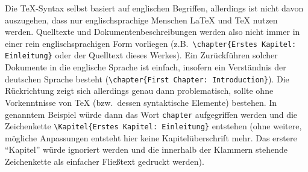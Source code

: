 Die \TeX{}-Syntax selbst basiert auf englischen Begriffen, allerdings ist nicht davon auszugehen, dass nur englischsprachige Menschen \LaTeX{} und \TeX{} nutzen werden. Quelltexte und Dokumentenbeschreibungen werden also nicht immer in einer rein englischsprachigen Form vorliegen (z.B.\ \verb|\chapter{Erstes Kapitel: Einleitung}| oder der Quelltext dieses Werkes). 
Ein Zurückführen solcher Dokumente in die englische Sprache ist einfach, insofern ein Verständnis der deutschen Sprache besteht (\verb|\chapter{First Chapter: Introduction}|). 
Die Rückrichtung zeigt sich allerdings genau dann problematisch, sollte ohne Vorkenntnisse von \TeX{} (bzw.\ dessen syntaktische Elemente) bestehen. In genanntem Beispiel würde dann das Wort \texttt{chapter} aufgegriffen werden und die Zeichenkette \verb|\Kapitel{Erstes Kapitel: Einleitung}| entstehen (ohne weitere, mögliche Anpassungen entsteht hier keine Kapitelüberschrift mehr. Das erstere \enquote{Kapitel} würde ignoriert werden und die innerhalb der Klammern stehende Zeichenkette als einfacher Fließtext gedruckt werden). 


